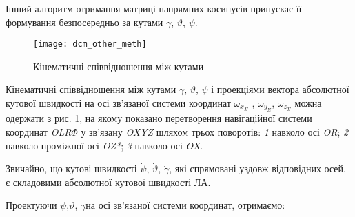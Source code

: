 Інший алгоритм отримання матриці напрямних косинусів припускає її  формування безпосередньо 
за кутами  $\gamma$, $\vartheta$, $\psi$. 
\begin{figure}[here]
\centering
\texttt{[image: dcm\_other\_meth]}
\caption{Кінематичні співвідношення між кутами}
\label{fig:kinemat}
\end{figure} 
Кінематичні співвідношення між кутами $\gamma$, $\vartheta$, $\psi$ і проекціями вектора абсолютної кутової 
швидкості на осі зв'язаної системи координат $\omega_{x_{\Sigma }}$ , $\omega_{y_{\Sigma }}$, 
$\omega_{z_{\Sigma}} $ можна одержати з рис. \ref{fig:kinemat}, 
на якому показано перетворення навігаційної системи координат \textit{OLR$\Phi $ }у 
зв'язану \textit{OXYZ} шляхом трьох поворотів: \textit{1}   навколо осі \textit{OR}; \textit{2}  
навколо проміжної осі \textit{OZ*}; \textit{3}  навколо осі \textit{OX}.

 Звичайно, що кутові швидкості $\dot{\psi }$, $\dot{\vartheta }$, $\dot{\gamma }$, 
які спрямовані уздовж відповідних осей, є складовими абсолютної кутової швидкості 
ЛА.

 Проектуючи $\dot{\psi }$,$\dot{\vartheta }$, $\dot{\gamma }$на осі зв'язаної системи 
координат, отримаємо:

